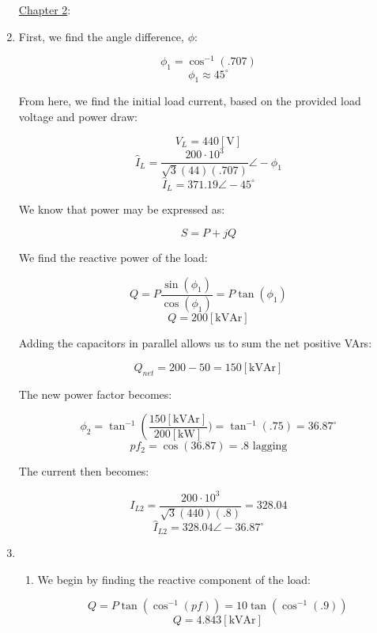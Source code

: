 \begin{enumerate}

    \begin{center}
      \underline{Chapter 2}:
    \end{center}

    \setcounter{enumi}{3}

  \item

    First, we find the angle difference, $\phi$:

    $$\phi_1=\cos^{-1}\left( .707 \right)$$
    $$\phi_1\approx 45^{\circ}$$

    From here, we find the initial load current, based on the provided load voltage and power draw:

    $$V_L=440\left[ \si{\volt} \right]$$
    $$\hat{I}_L=\frac{200\cdot10^3}{\sqrt{3}(44)(.707)}\angle-\phi_1$$
    $$\hat{I}_L=371.19\angle -45^{\circ}$$

    We know that power may be expressed as:

    $$S=P+jQ$$

    We find the reactive power of the load:

    $$Q=P\frac{\sin(\phi_1)}{\cos(\phi_1)}=P\tan(\phi_1)$$
    $$Q=200[\si{\kilo}\text{VAr}]$$

    Adding the capacitors in parallel allows us to sum the net positive VArs:

    $$Q_{net}=200-50=150[\si{\kilo}\text{VAr}]$$

    The new power factor becomes:

    $$\phi_2=\tan^{-1}\left(\frac{150[\si{\kilo}\text{VAr}]}{200[\si{\kilo\watt}]})=\tan^{-1}(.75)=36.87^{\circ}$$
    $$\boxed{pf_2=\cos(36.87)=.8\text{ lagging}}$$

    The current then becomes:

    $$I_{L2}=\frac{200\cdot10^3}{\sqrt{3}(440)(.8)}=328.04$$
    $$\boxed{\hat{I}_{L2}=328.04\angle -36.87^{\circ}}$$

  \item

    \begin{enumerate}

      \item 

        We begin by finding the reactive component of the load:

        $$Q=P\tan(\cos^{-1}(pf))=10\tan(\cos^{-1}(.9))$$
        $$Q=4.843[\si{\kilo}\text{VAr}]$$


\end{enumerate}
\end{enumerate}
